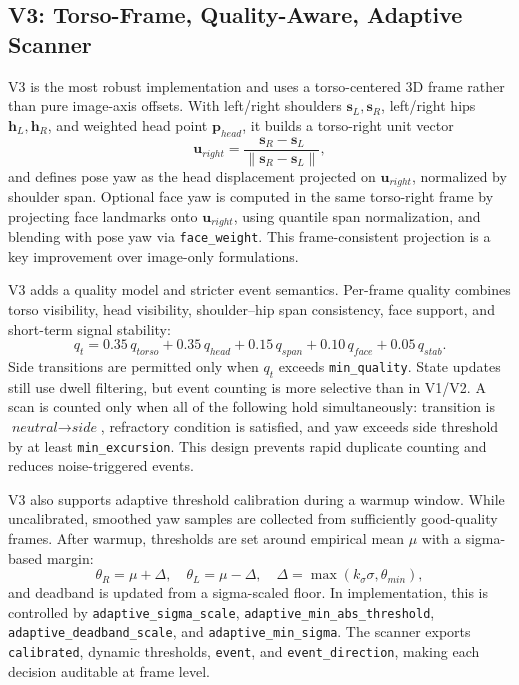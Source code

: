 \documentclass[11pt,a4paper]{article}
\begin{document}
\subsection{V3: Torso-Frame, Quality-Aware, Adaptive Scanner}
V3 is the most robust implementation and uses a torso-centered 3D frame rather than pure image-axis offsets. With left/right shoulders \(\mathbf{s}_L,\mathbf{s}_R\), left/right hips \(\mathbf{h}_L,\mathbf{h}_R\), and weighted head point \(\mathbf{p}_{head}\), it builds a torso-right unit vector
\[
\mathbf{u}_{right}=\frac{\mathbf{s}_R-\mathbf{s}_L}{\|\mathbf{s}_R-\mathbf{s}_L\|},
\]
and defines pose yaw as the head displacement projected on \(\mathbf{u}_{right}\), normalized by shoulder span. Optional face yaw is computed in the same torso-right frame by projecting face landmarks onto \(\mathbf{u}_{right}\), using quantile span normalization, and blending with pose yaw via \texttt{face\_weight}. This frame-consistent projection is a key improvement over image-only formulations.

V3 adds a quality model and stricter event semantics. Per-frame quality combines torso visibility, head visibility, shoulder--hip span consistency, face support, and short-term signal stability:
\[
q_t = 0.35\,q_{torso}+0.35\,q_{head}+0.15\,q_{span}+0.10\,q_{face}+0.05\,q_{stab}.
\]
Side transitions are permitted only when \(q_t\) exceeds \texttt{min\_quality}. State updates still use dwell filtering, but event counting is more selective than in V1/V2. A scan is counted only when all of the following hold simultaneously: transition is \(\textit{neutral}\rightarrow\textit{side}\), refractory condition is satisfied, and yaw exceeds side threshold by at least \texttt{min\_excursion}. This design prevents rapid duplicate counting and reduces noise-triggered events.

V3 also supports adaptive threshold calibration during a warmup window. While uncalibrated, smoothed yaw samples are collected from sufficiently good-quality frames. After warmup, thresholds are set around empirical mean \(\mu\) with a sigma-based margin:
\[
\theta_R=\mu+\Delta,\quad \theta_L=\mu-\Delta,\quad
\Delta=\max(k_\sigma \sigma,\theta_{min}),
\]
and deadband is updated from a sigma-scaled floor. In implementation, this is controlled by \texttt{adaptive\_sigma\_scale}, \texttt{adaptive\_min\_abs\_threshold}, \texttt{adaptive\_deadband\_scale}, and \texttt{adaptive\_min\_sigma}. The scanner exports \texttt{calibrated}, dynamic thresholds, \texttt{event}, and \texttt{event\_direction}, making each decision auditable at frame level.
\end{document}
